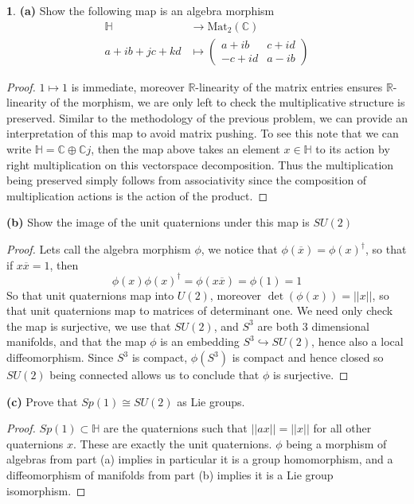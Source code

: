 \documentclass[10.5pt]{article}
\theoremstyle{definition}
\newtheorem{pb}{}
\newcommand{\norm}[1]{\lvert\lvert#1\rvert\rvert}
\begin{document}
    \begin{pb}
        \textbf{(a)} Show the following map is an algebra morphism
        \begin{align*}
            \mathbb{H} &\to \text{Mat}_2(\mathbb{C}) \\
            a + ib + jc + kd &\mapsto \begin{pmatrix} a + ib & c + id \\ -c + id & a - ib \end{pmatrix}
        \end{align*}
        \begin{proof}
            \(1 \mapsto 1\) is immediate, moreover \(\mathbb{R}\)-linearity of the matrix entries ensures \(\mathbb{R}\)-linearity of the morphism, we are only left to check the multiplicative structure is preserved. Similar to the methodology of the previous problem, we can provide an interpretation of this map to avoid matrix pushing. To see this note that we can write \(\mathbb{H} = \mathbb{C} \oplus \mathbb{C} j\), then the map above takes an element \(x \in \mathbb{H}\) to its action by right multiplication on this vectorspace decomposition. Thus the multiplication being preserved simply follows from associativity since the composition of multiplication actions is the action of the product.
        \end{proof}

        \textbf{(b)} Show the image of the unit quaternions under this map is \(SU(2)\)
        \begin{proof}
            Lets call the algebra morphism \(\phi\), we notice that \(\phi(\overline{x}) = \phi(x)^\dagger\), so that if \(x \overline{x} = 1\), then \[\phi(x) \phi(x)^\dagger = \phi(x \overline{x}) = \phi(1) = 1\]
            So that unit quaternions map into \(U(2)\), moreover \(\det(\phi(x)) = \norm{x}\), so that unit quaternions map to matrices of determinant one. We need only check the map is surjective, we use that \(SU(2)\), and \(S^3\) are both \(3\) dimensional manifolds, and that the map \(\phi\) is an embedding \(S^3 \hookrightarrow SU(2)\), hence also a local diffeomorphism. Since \(S^3\) is compact, \(\phi(S^3)\) is compact and hence closed so \(SU(2)\) being connected allows us to conclude that \(\phi\) is surjective.
        \end{proof}

        \textbf{(c)} Prove that \(Sp(1) \cong SU(2)\) as Lie groups.
        \begin{proof}
        \(Sp(1) \subset \mathbb{H}\) are the quaternions such that \(\norm{ax} = \norm{x}\) for all other quaternions \(x\). These are exactly the unit quaternions. \(\phi\) being a morphism of algebras from part (a) implies in particular it is a group homomorphism, and a diffeomorphism of manifolds from part (b) implies it is a Lie group isomorphism.
        \end{proof}
    \end{pb}
\end{document}
